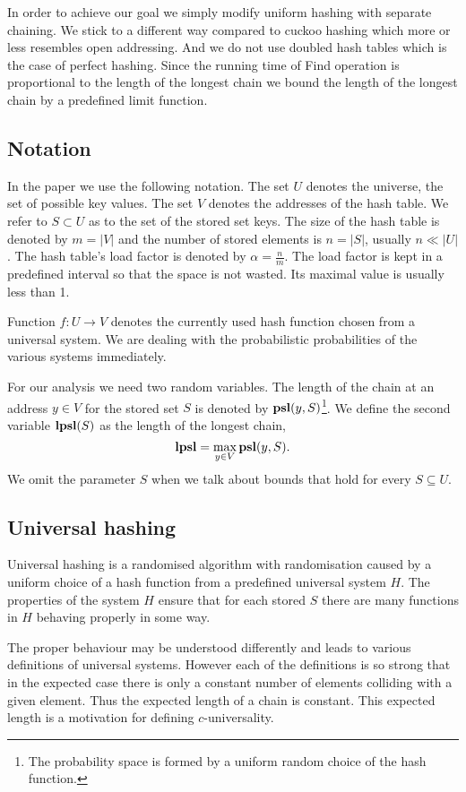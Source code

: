 In order to achieve our goal we simply modify uniform hashing with separate chaining. We stick to a different way compared to cuckoo hashing which more or less resembles open addressing. And we do not use doubled hash tables which is the case of perfect hashing. Since the running time of Find operation is proportional to the length of the longest chain we bound the length of the longest chain by a predefined limit function.

\subsection{Notation}
In the paper we use the following notation. The set $U$ denotes the universe, the set of possible key values. The set $V$ denotes the addresses of the hash table. We refer to $S \subset U$ as to the set of the stored set keys. The size of the hash table is denoted by $m = |V|$ and the number of stored elements is $n = |S|$, usually $n \ll |U|$. The hash table's load factor is denoted by $\alpha = \frac{n}{m}$. The load factor is kept in a predefined interval so that the space is not wasted. Its maximal value is usually less than 1.

Function $f\colon U \rightarrow V$ denotes the currently used hash function chosen from a universal system. We are dealing with the probabilistic probabilities of the various systems immediately.

For our analysis we need two random variables. The length of the chain at an address $y \in V$ for the stored set $S$ is denoted by $\mathbf{psl}(y, S)$\footnote{The probability space is formed by a uniform random choice of the hash function.}. We define the second variable $\mathbf{lpsl}(S)$ as the length of the longest chain, $$\mathbf{lpsl} = \max_{y \in V} \mathbf{psl}(y, S).$$ We omit the parameter $S$ when we talk about bounds that hold for every $S \subseteq U$.

\subsection{Universal hashing}
Universal hashing is a randomised algorithm with randomisation caused by a uniform choice of a hash function from a predefined universal system $H$. The properties of the system $H$ ensure that for each stored $S$ there are many functions in $H$ behaving properly in some way.

The proper behaviour may be understood differently and leads to various definitions of universal systems. However each of the definitions is so strong that in the expected case there is only a constant number of elements colliding with a given element. Thus the expected length of a chain is constant. This expected length is a motivation for defining $c$-universality.

